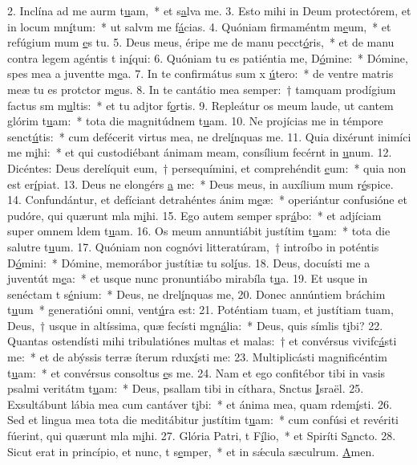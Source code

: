 2. Inclína ad me aurm t\uline{u}am,~* et s\uline{a}lva me.
3. Esto mihi in Deum protectórem, et in locum mn\uline{í}tum:~* ut salvm me f\uline{á}cias.
4. Quóniam firmaméntm m\uline{e}um,~* et refúgium mum \uline{e}s tu.
5. Deus meus, éripe me de manu pecct\uline{ó}ris,~* et de manu contra legem agéntis t in\uline{í}qui:
6. Quóniam tu es patiéntia me, D\uline{ó}mine:~* Dómine, spes mea a juventte m\uline{e}a.
7. In te confirmátus sum x \uline{ú}tero:~* de ventre matris meæ tu es protctor m\uline{e}us.
8. In te cantátio mea semper:~† tamquam prodígium factus sm m\uline{u}ltis:~* et tu adjtor f\uline{o}rtis.
9. Repleátur os meum laude, ut cantem glórim t\uline{u}am:~* tota die magnitúdnem t\uline{u}am.
10. Ne projícias me in témpore senct\uline{ú}tis:~* cum defécerit virtus mea, ne drel\uline{í}nquas me.
11. Quia dixérunt inimíci me m\uline{i}hi:~* et qui custodiébant ánimam meam, consílium fecérnt in \uline{u}num.
12. Dicéntes: Deus derelíquit eum,~† persequímini, et comprehéndit \uline{e}um:~* quia non est  er\uline{í}piat.
13. Deus ne elongérs \uline{a} me:~* Deus meus, in auxílium mum r\uline{é}spice.
14. Confundántur, et defíciant detrahéntes ánim m\uline{e}æ:~* operiántur confusióne et pudóre, qui quærunt mla m\uline{i}hi.
15. Ego autem semper spr\uline{á}bo:~* et adjíciam super omnem ldem t\uline{u}am.
16. Os meum annuntiábit justítim t\uline{u}am:~* tota die salutre t\uline{u}um.
17. Quóniam non cognóvi litteratúram,~† introíbo in poténtis D\uline{ó}mini:~* Dómine, memorábor justítiæ tu sol\uline{í}us.
18. Deus, docuísti me a juventút m\uline{e}a:~* et usque nunc pronuntiábo mirabíla t\uline{u}a.
19. Et usque in senéctam t s\uline{é}nium:~* Deus, ne drel\uline{í}nquas me,
20. Donec annúntiem bráchim t\uline{u}um~* generatióni omni,  vent\uline{ú}ra est:
21. Poténtiam tuam, et justítiam tuam, Deus,~† usque in altíssima, quæ fecísti mgn\uline{á}lia:~* Deus, quis símlis t\uline{i}bi?
22. Quantas ostendísti mihi tribulatiónes multas et malas:~† et convérsus vivifc\uline{á}sti me:~* et de abýssis terræ íterum rdux\uline{í}sti me:
23. Multiplicásti magnificéntim t\uline{u}am:~* et convérsus consoltus \uline{e}s me.
24. Nam et ego confitébor tibi in vasis psalmi veritátm t\uline{u}am:~* Deus, psallam tibi in cíthara, Snctus \uline{I}sraël.
25. Exsultábunt lábia mea cum cantáver t\uline{i}bi:~* et ánima mea, quam rdem\uline{í}sti.
26. Sed et lingua mea tota die meditábitur justítim t\uline{u}am:~* cum confúsi et revériti fúerint, qui quærunt mla m\uline{i}hi.
27. Glória Patri, t F\uline{í}lio,~* et Spiríti S\uline{a}ncto.
28. Sicut erat in princípio, et nunc, t s\uline{e}mper,~* et in sǽcula sæculrum. \uline{A}men.
